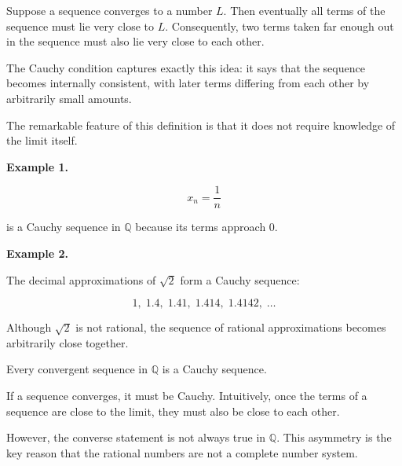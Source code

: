 \begin{remark}
\label{rem:cauchy-teacher-2}

Suppose a sequence converges to a number $L$.  Then eventually all
terms of the sequence must lie very close to $L$.  Consequently, two
terms taken far enough out in the sequence must also lie very close to
each other.

The Cauchy condition captures exactly this idea: it says that the
sequence becomes internally consistent, with later terms differing
from each other by arbitrarily small amounts.

The remarkable feature of this definition is that it does not require
knowledge of the limit itself.

\end{remark}


\begin{remark}[Examples]

\textbf{Example 1.}

\[
x_n = \frac{1}{n}
\]

is a Cauchy sequence in $\mathbb{Q}$ because its terms approach $0$.

\medskip

\textbf{Example 2.}

The decimal approximations of $\sqrt{2}$ form a Cauchy sequence:

\[
1,\;
1.4,\;
1.41,\;
1.414,\;
1.4142,\;\dots
\]

Although $\sqrt{2}$ is not rational, the sequence of rational
approximations becomes arbitrarily close together.

\end{remark}


\begin{theorem}
\label{thm:convergent-implies-cauchy-q}

Every convergent sequence in $\mathbb{Q}$ is a Cauchy sequence.

\end{theorem}


\begin{remark}
\label{rem:cauchy-one-way}

If a sequence converges, it must be Cauchy.  Intuitively, once the
terms of a sequence are close to the limit, they must also be close to
each other.

However, the converse statement is not always true in $\mathbb{Q}$.
This asymmetry is the key reason that the rational numbers are not a
complete number system.

\end{remark}

